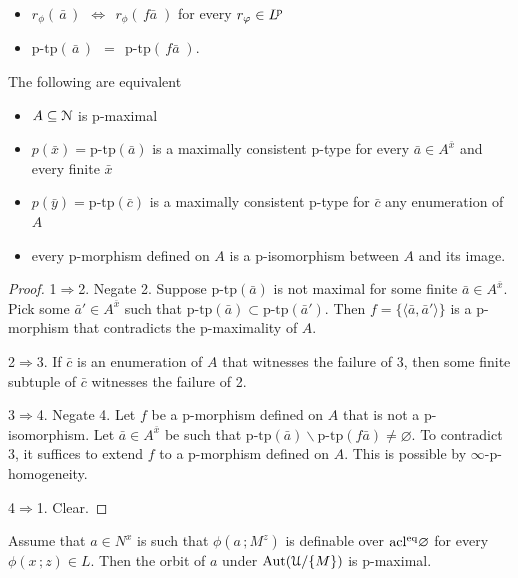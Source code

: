 \begin{itemize}
  \item[a.] $r_{\phi}(\,\bar a\,)\ \ \Leftrightarrow\ \ r_{\phi}(\,f\!\bar a\;)$ \hfill
  for every $r_{\phi}\in L^{\rm\! p}$

  \item[b.] $\textrm{p-tp}(\,\bar a\,)\ \ =\ \ \textrm{p-tp}(\,f\!\bar a\;)$.
\end{itemize}


\begin{fact}\label{fact_pmaximal}
  The following are equivalent
  \begin{itemize}
    \item[1.] $A\subseteq\N$ is p-maximal
    \item[2.] $p(\bar x)=\textrm{p-tp}(\bar a)$ is a maximally consistent p-type for every $\bar a\in A^{\bar x}$ and every finite $\bar x$
    \item[3.] $p(\bar y)=\textrm{p-tp}(\bar c)$ is a maximally consistent p-type for $\bar c$ any enumeration of $A$
    \item[4.] every p-morphism defined on $A$ is a p-isomorphism between $A$ and its image.
  \end{itemize}
\end{fact}

\begin{proof}
  1$\Rightarrow$2. Negate 2. Suppose $\textrm{p-tp}(\bar a)$ is not maximal for some finite $\bar a\in A^{\bar x}$.
  Pick some $\bar a'\in A^{\bar x}$ such that $\textrm{p-tp}(\bar a)\subset \textrm{p-tp}(\bar a')$.
  Then $f=\{\langle \bar a,\bar a'\rangle\}$ is a p-morphism that contradicts the p-maximality of $A$.
  
  2$\Rightarrow$3. If $\bar c$ is an enumeration of $A$ that witnesses the failure of 3, then some finite subtuple of $\bar c$ witnesses the failure of 2.

  3$\Rightarrow$4. Negate 4. Let $f$ be a p-morphism defined on $A$ that is not a p-isomorphism.
  Let $\bar a\in A^{\bar x}$ be such that  $\textrm{p-tp}(\bar a)\smallsetminus \textrm{p-tp}(f\bar a)\neq\varnothing$.
  To contradict 3, it suffices to extend $f$ to a p-morphism defined on $A$.
  This is possible by $\infty$-p-homogeneity.

  4$\Rightarrow$1. Clear.
\end{proof}

\begin{example}
  Assume that $a\in N^x$ is such that $\phi(a\,;M^z)$ is definable over ${\rm acl^{eq}}\varnothing$ for every $\phi(x\,;z)\in L$.
  Then the orbit of $a$ under ${\rm Aut}(\U/\{M\})$ is p-maximal.
\end{example}

